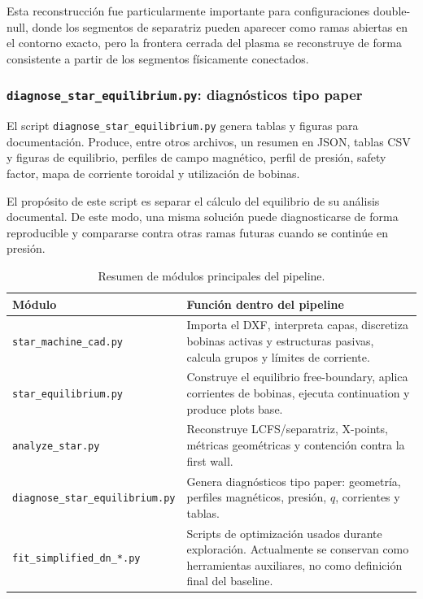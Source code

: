 \documentclass[11pt,a4paper]{article}
\begin{document}
Esta reconstrucción fue particularmente importante para configuraciones double-null, donde
los segmentos de separatriz pueden aparecer como ramas abiertas en el contorno exacto, pero
la frontera cerrada del plasma se reconstruye de forma consistente a partir de los segmentos
físicamente conectados.

\subsubsection{\texttt{diagnose\_star\_equilibrium.py}: diagnósticos tipo paper}
El script \texttt{diagnose\_star\_equilibrium.py} genera tablas y figuras para documentación.
Produce, entre otros archivos, un resumen en JSON, tablas CSV y figuras de equilibrio,
perfiles de campo magnético, perfil de presión, safety factor, mapa de corriente toroidal y
utilización de bobinas.

El propósito de este script es separar el cálculo del equilibrio de su análisis documental. De
este modo, una misma solución puede diagnosticarse de forma reproducible y compararse contra
otras ramas futuras cuando se continúe en presión.

\begin{table}[htbp]
\centering
\caption{Resumen de módulos principales del pipeline.}
\label{tab:pipeline_modules_detailed}
\begin{tabularx}{\textwidth}{p{}X}
\toprule
\textbf{Módulo} & \textbf{Función dentro del pipeline} \\
\midrule
\texttt{star\_machine\_cad.py} & Importa el DXF, interpreta capas, discretiza bobinas activas y estructuras pasivas, calcula grupos y límites de corriente. \\
\texttt{star\_equilibrium.py} & Construye el equilibrio free-boundary, aplica corrientes de bobinas, ejecuta continuation y produce plots base. \\
\texttt{analyze\_star.py} & Reconstruye LCFS/separatriz, X-points, métricas geométricas y contención contra la first wall. \\
\texttt{diagnose\_star\_equilibrium.py} & Genera diagnósticos tipo paper: geometría, perfiles magnéticos, presión, $q$, corrientes y tablas. \\
\texttt{fit\_simplified\_dn\_*.py} & Scripts de optimización usados durante exploración. Actualmente se conservan como herramientas auxiliares, no como definición final del baseline. \\
\bottomrule
\end{tabularx}
\end{table}
\end{document}
